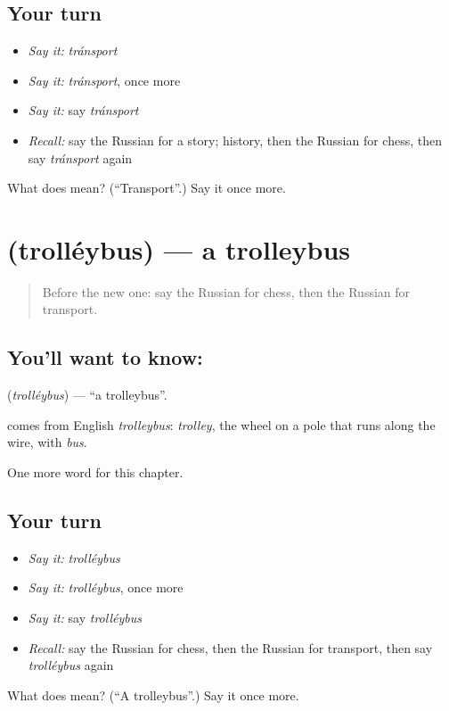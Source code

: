 \subsection*{Your turn}
\begin{itemize}
\raggedright
  \item \emph{Say it:} \emph{tránsport}
  \item \emph{Say it:} \emph{tránsport}, once more
  \item \emph{Say it:} say \emph{tránsport}
  \item \emph{Recall:} say the Russian for a story; history, then the Russian for chess, then say \emph{tránsport} again
\end{itemize}

\begin{tcolorbox}[breakable,colback=teal!4,colframe=teal!35!black,title={Before you move on}]
What does  mean? (\textquotedblleft{}Transport\textquotedblright{}.) Say it once more.
\end{tcolorbox}
\section[\texorpdfstring{\ru{троллейбус} (trolléybus)}{троллейбус (trolléybus)}]{ (trolléybus) — a trolleybus}

\label{lesson:RU-C253-trolleybus}



\begin{quote}
Before the new one: say the Russian for chess, then the Russian for transport.
\end{quote}

\subsection*{You'll want to know: }
\textbf{} (\emph{trolléybus}) — \textquotedblleft{}a trolleybus\textquotedblright{}.

\begin{cousinweb}
\textbf{} comes from English \emph{trolleybus}: \emph{trolley}, the wheel on a pole that runs along the wire, with \emph{bus}.
\end{cousinweb}

\begin{grammarlens}[title={What you've built}]
One more word for this chapter.
\end{grammarlens}

\subsection*{Your turn}
\begin{itemize}
\raggedright
  \item \emph{Say it:} \emph{trolléybus}
  \item \emph{Say it:} \emph{trolléybus}, once more
  \item \emph{Say it:} say \emph{trolléybus}
  \item \emph{Recall:} say the Russian for chess, then the Russian for transport, then say \emph{trolléybus} again
\end{itemize}

\begin{tcolorbox}[breakable,colback=teal!4,colframe=teal!35!black,title={Before you move on}]
What does  mean? (\textquotedblleft{}A trolleybus\textquotedblright{}.) Say it once more.
\end{tcolorbox}
